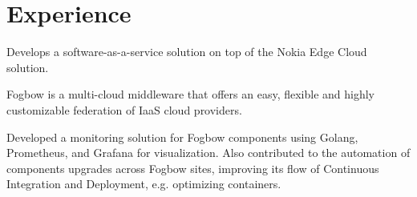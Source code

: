 \documentclass[]{deedy-resume-openfont}
\begin{document}
\begin{minipage}[t]{0.65\textwidth} 


\section{Experience}


\vspace{\topsep} %
\begin{tightemize}
\item Develops a software-as-a-service solution on top of the Nokia Edge Cloud solution.
\end{tightemize}
\sectionsep


\vspace{\topsep} %
\begin{tightemize}
\item Fogbow is a multi-cloud middleware that offers an easy, flexible and highly customizable federation of IaaS cloud providers. 
\item Developed a monitoring solution for Fogbow components using Golang, Prometheus, and Grafana for visualization. Also contributed to the automation of components upgrades across Fogbow sites, improving its flow of Continuous Integration and Deployment, e.g. optimizing containers.
\end{tightemize}
\sectionsep



\end{minipage}
\end{document}
